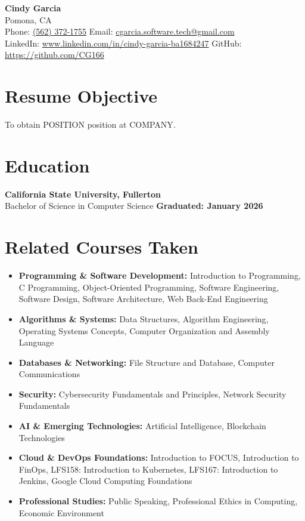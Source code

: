 \documentclass[11pt]{article}
\begin{document}
\begin{center}
    {\LARGE \textbf{Cindy Garcia}} \\[6pt]
    Pomona, CA \\[4pt]
    Phone: \href{tel:+15623721755}{(562) 372-1755} \textbar{} 
    Email: \href{mailto:cgarcia.software.tech@gmail.com}{cgarcia.software.tech@gmail.com} \\[4pt]
    LinkedIn: \href{https://www.linkedin.com/in/cindy-garcia-ba1684247}{www.linkedin.com/in/cindy-garcia-ba1684247} \textbar{} 
    GitHub: \href{https://github.com/CG166}{https://github.com/CG166}
\end{center}

\section*{Resume Objective}
To obtain {{{POSITION}}} position at {{{COMPANY}}}.

\section*{Education}
\textbf{California State University, Fullerton} \\
Bachelor of Science in Computer Science \hfill \textbf{Graduated: January 2026}

\section*{Related Courses Taken}
\begin{itemize}[leftmargin=*, noitemsep]
    \item \textbf{Programming \& Software Development:} Introduction to Programming, C Programming, Object-Oriented Programming, Software Engineering, Software Design, Software Architecture, Web Back-End Engineering
    \item \textbf{Algorithms \& Systems:} Data Structures, Algorithm Engineering, Operating Systems Concepts, Computer Organization and Assembly Language
    \item \textbf{Databases \& Networking:} File Structure and Database, Computer Communications
    \item \textbf{Security:} Cybersecurity Fundamentals and Principles, Network Security Fundamentals
    \item \textbf{AI \& Emerging Technologies:} Artificial Intelligence, Blockchain Technologies
    \item \textbf{Cloud \& DevOps Foundations:} Introduction to FOCUS, Introduction to FinOps, LFS158: Introduction to Kubernetes, LFS167: Introduction to Jenkins, Google Cloud Computing Foundations
    \item \textbf{Professional Studies:} Public Speaking, Professional Ethics in Computing, Economic Environment
\end{itemize}
\end{document}
